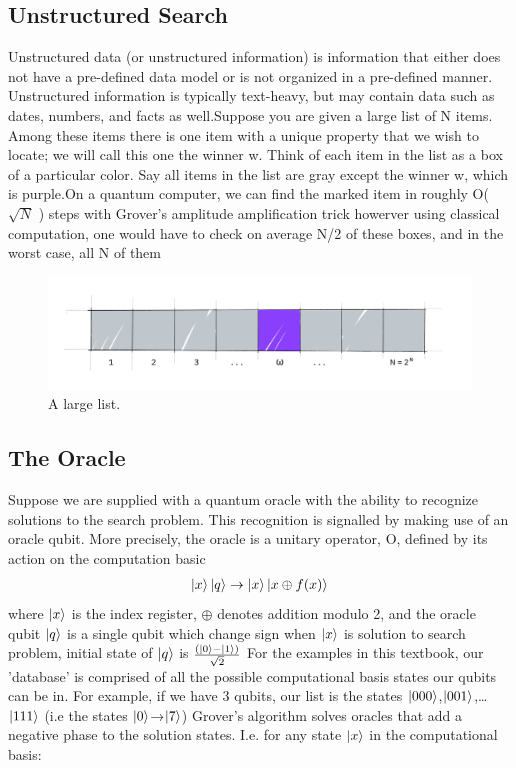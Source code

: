 \documentclass[letterpaper,11pt]{article}
\begin{document}
\subsection{Unstructured Search}
    Unstructured data (or unstructured information) is information that either does not have a pre-defined data model or is not organized in a pre-defined manner. Unstructured information is typically text-heavy, but may contain data such as dates, numbers, and facts as well.Suppose you are given a large list of N items. Among these items there is one item with a unique property that we wish to locate; we will call this one the winner w. Think of each item in the list as a box of a particular color. Say all items in the list are gray except the winner w, which is purple.On a quantum computer, we can find the marked item in roughly O($\sqrt{N}$ ) steps with Grover's amplitude amplification trick howerver using classical computation, one would have to check on average N/2 of these boxes, and in the worst case, all N of them
    \begin{figure}
    \includegraphics[width=\linewidth]{grover_list.png}
     \caption{A large list.}
    \label{fig:large list}
    \end{figure}
\subsection{The Oracle}
Suppose we are supplied with a quantum oracle with the ability to recognize
solutions to the search problem. This recognition is signalled by making use of an oracle qubit. More precisely, the oracle is a unitary operator, O, defined by its action on the
computation basic
\begin{align*}
    \ket{x} \ket{q} \rightarrow \ket{x} \ket{x \oplus f(x)}
\end{align*}
where $\ket{x}$ is the index register, $\oplus$ denotes addition modulo 2, and the oracle qubit $\ket{q}$ is
a single qubit which change sign when $\ket{x}$ is solution to search problem, initial state of $\ket{q}$ is $\frac{(\ket{0} - \ket{1})}{\sqrt{2}}$
For the examples in this textbook, our 'database' is comprised of all the possible computational basis states our qubits can be in. For example, if we have 3 qubits, our list is the states $\ket{000}$,$\ket{001}$,…$\ket{111}$ (i.e the states $\ket{0}$→$\ket{7}$)
\newline
Grover’s algorithm solves oracles that add a negative phase to the solution states. I.e. for any state $\ket{x}$ in the computational basis:
\end{document}
